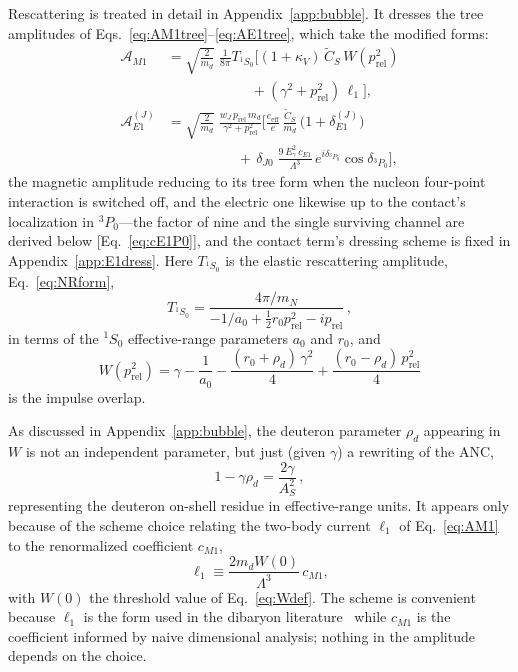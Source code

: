 \documentclass[
  aps,prd,twocolumn,nofootinbib,superscriptaddress,
  longbibliography,floatfix,preprintnumbers
]{revtex4-2}
\newcommand{\prel}{p_{\mathrm{rel}}}
\newcommand{\Egam}{E_{\gamma}}
\newcommand{\kappaV}{\kappa_{V}}
\newcommand{\Mone}{M1}
\newcommand{\Eone}{E1}
\newcommand{\AS}{A_{S}}
\newcommand{\CSv}{\tilde{C}_{S}}
\begin{document}
Rescattering is treated in detail in Appendix~\ref{app:bubble}. It dresses the
tree amplitudes of Eqs.~\eqref{eq:AM1tree}--\eqref{eq:AE1tree}, which take the modified forms:
\begin{align}
  \mathcal{A}_{\Mone} &= \sqrt{\frac{2}{m_{d}}}\;\frac{1}{8\pi} T_{^1S_0}
    \Big[(1+\kappaV)\,\CSv\,W(\prel^{2}) \nonumber\\
   &\qquad\qquad\qquad +(\gamma^{2}+\prel^{2})\,\ell_{1}\Big],
  \label{eq:AM1}\\
  \mathcal{A}_{\Eone}^{(J)} &= \sqrt{\frac{2}{m_{d}}}\;
    \frac{w_{J}\,\prel\,m_{d}}{\gamma^{2}+\prel^{2}}
    \bigg[\frac{e_{\mathrm{eff}}}{e}\,\frac{\CSv}{m_{d}}\,
      \big(1+\delta_{\Eone}^{(J)}\big) \nonumber\\
   &\qquad\qquad\quad
    +\,\delta_{J0}\;\frac{9\,\Egam^{2}\,c_{\Eone}}{\Lambda^{3}}\,
      e^{i\delta_{^{3}P_{0}}}\cos\delta_{^{3}P_{0}}\bigg],
  \label{eq:AE1}
\end{align}
the magnetic amplitude reducing to its tree form when the nucleon four-point
interaction is switched off, and the electric one likewise up to the contact's
localization in ${}^{3}P_{0}$---the factor of nine and the single surviving channel
are derived below [Eq.~\eqref{eq:cE1P0}], and the contact term's dressing scheme is
fixed in Appendix~\ref{app:E1dress}. Here $T_{^1S_0}$ is the elastic rescattering amplitude,
Eq.~\eqref{eq:NRform},
\begin{equation}
  T_{^1S_0} = \frac{4\pi/m_{N}}
    {-1/a_{0}+\tfrac12 r_{0}\prel^{2}-i\prel}\,,
  \label{eq:T1S0}
\end{equation}
in terms of the ${}^{1}S_{0}$ effective-range parameters $a_{0}$ and $r_{0}$, and
\begin{equation}
  W(\prel^{2}) = \gamma-\frac{1}{a_{0}}
    -\frac{(r_{0}+\rho_{d})\,\gamma^{2}}{4}
    +\frac{(r_{0}-\rho_{d})\,\prel^{2}}{4}
  \label{eq:Wdef}
\end{equation}
is the impulse overlap.

As discussed in Appendix~\ref{app:bubble}, the deuteron parameter $\rho_{d}$ appearing in $W$ is not an independent parameter, but just (given $\gamma$)
a rewriting of the ANC,
\begin{equation}
  1-\gamma\rho_{d} = \frac{2\gamma}{\AS^{2}}\,,
  \label{eq:rhoANC}
\end{equation}
representing the deuteron on-shell residue in effective-range
units. It appears only because of the scheme choice relating the two-body
current $\ell_{1}$ of Eq.~\eqref{eq:AM1} to the renormalized coefficient
$c_{\Mone}$,
\begin{equation}
  \ell_{1} \equiv \frac{2m_{d}W(0)}{\Lambda^{3}}\,c_{\Mone},
  \label{eq:cM1def}
\end{equation}
with $W(0)$ the threshold value of Eq.~\eqref{eq:Wdef}. The scheme is convenient
because $\ell_{1}$ is the form used in the dibaryon
literature~\cite{Ando:2005cz,Rupak:1999rk} while $c_{\Mone}$ is the coefficient
informed by naive dimensional analysis; nothing in the amplitude depends on the choice.
\end{document}
